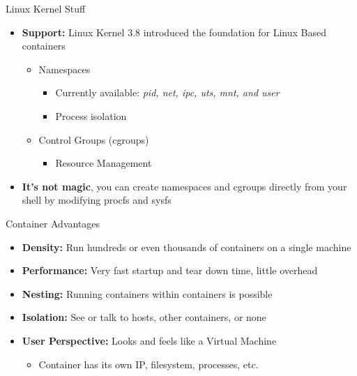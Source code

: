 \documentclass[xcolor=svgnames,handout]{beamer}
\begin{document}
\begin{frame}{Linux Kernel Stuff}
  \begin{itemize}
    \item \textbf{Support:} Linux Kernel 3.8 introduced the foundation for Linux Based containers
      \begin{itemize}
        \item Namespaces
      		\begin{itemize}
        		\item Currently available: \textit{pid, net, ipc, uts, mnt, and user}
        		\item Process isolation
      		\end{itemize}
        \item Control Groups (cgroups)
      		\begin{itemize}
        		\item Resource Management
      		\end{itemize}
      \end{itemize}
    \item \textbf{It’s not magic}, you can create namespaces and cgroups directly from your shell by modifying procfs and sysfs
  \end{itemize}
\end{frame}


\begin{frame}{Container Advantages}
  \begin{itemize}
    \item \textbf{Density:} Run hundreds or even thousands of containers on a single machine
    \item \textbf{Performance:} Very fast startup and tear down time, little overhead
    \item \textbf{Nesting:} Running containers within containers is possible
    \item \textbf{Isolation:} See or talk to hosts, other containers, or none
    \item \textbf{User Perspective:} Looks and feels like a Virtual Machine
	\begin{itemize}
       		\item Container has its own IP, filesystem, processes, etc.
      	\end{itemize}
  \end{itemize}
\end{frame}
\end{document}
